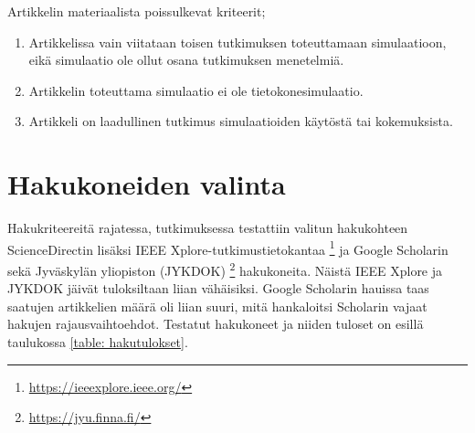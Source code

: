 \documentclass[utf8]{gradu3}
\begin{document}
Artikkelin materiaalista poissulkevat kriteerit;
\begin{enumerate}
    \item Artikkelissa vain viitataan toisen tutkimuksen toteuttamaan simulaatioon, eikä simulaatio ole ollut osana tutkimuksen menetelmiä.
    \item Artikkelin toteuttama simulaatio ei ole tietokonesimulaatio.
    \item Artikkeli on laadullinen tutkimus simulaatioiden käytöstä tai kokemuksista.
\end{enumerate}

\section{Hakukoneiden valinta} \label{hakukoneiden valinta}
Hakukriteereitä rajatessa, tutkimuksessa testattiin valitun hakukohteen ScienceDirectin lisäksi IEEE Xplore-tutkimustietokantaa 
\footnote{\url{https://ieeexplore.ieee.org/}} ja Google Scholarin 
sekä Jyväskylän yliopiston (JYKDOK) \footnote{\url{https://jyu.finna.fi/}} hakukoneita. Näistä IEEE Xplore ja JYKDOK jäivät tuloksiltaan liian vähäisiksi.
Google Scholarin hauissa taas saatujen artikkelien määrä oli liian suuri, 
mitä hankaloitsi Scholarin vajaat hakujen rajausvaihtoehdot. 
Testatut hakukoneet ja niiden tuloset on esillä taulukossa \ref{table: hakutulokset}.
\end{document}
